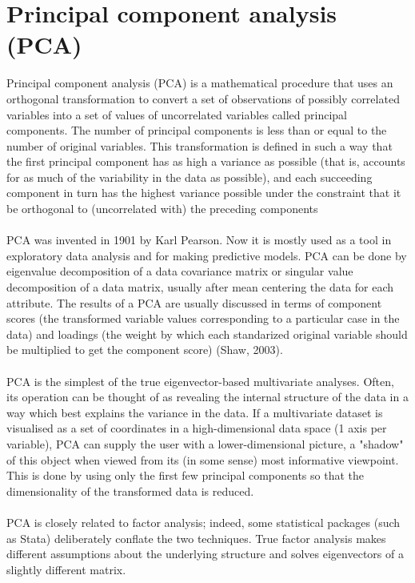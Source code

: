 \documentclass[10pt,a4paper]{article}
\begin{document}
\section{Principal component analysis (PCA)} 

Principal component analysis (PCA) is a mathematical procedure that uses an orthogonal transformation to convert a set of observations of possibly correlated variables into a set of values of uncorrelated variables called principal components. The number of principal components is less than or equal to the number of original variables. This transformation is defined in such a way that the first principal component has as high a variance as possible (that is, accounts for as much of the variability in the data as possible), and each succeeding component in turn has the highest variance possible under the constraint that it be orthogonal to (uncorrelated with) the preceding components \\ \\

PCA was invented in 1901 by Karl Pearson.  Now it is mostly used as a tool in exploratory data analysis and for making predictive models. PCA can be done by eigenvalue decomposition of a data covariance matrix or singular value decomposition of a data matrix, usually after mean centering the data for each attribute. The results of a PCA are usually discussed in terms of component scores (the transformed variable values corresponding to a particular case in the data) and loadings (the weight by which each standarized original variable should be multiplied to get the component score) (Shaw, 2003).\\ \\

PCA is the simplest of the true eigenvector-based multivariate analyses. Often, its operation can be thought of as revealing the internal structure of the data in a way which best explains the variance in the data. If a multivariate dataset is visualised as a set of coordinates in a high-dimensional data space (1 axis per variable), PCA can supply the user with a lower-dimensional picture, a "shadow" of this object when viewed from its (in some sense) most informative viewpoint. This is done by using only the first few principal components so that the dimensionality of the transformed data is reduced. \\ \\

PCA is closely related to factor analysis; indeed, some statistical packages (such as Stata) deliberately conflate the two techniques. True factor analysis makes different assumptions about the underlying structure and solves eigenvectors of a slightly different matrix. \\ \\
\end{document}
